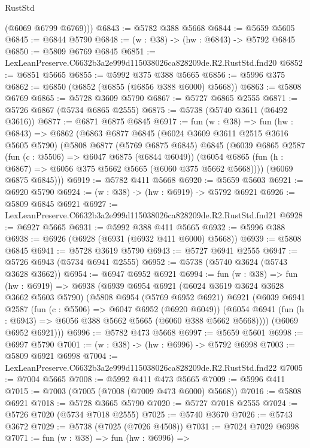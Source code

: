 \begin{lexlean}{RustStd}
\begin{coremodule}
        (@6069 @6799 @6769)))
@6843 := @5782 @388 @5668
@6844 := @5659 @5605
@6845 := @6844 @5790
@6848 := (w : @38) -> (hw : @6843) -> @5792 @6845
@6850 := @5809 @6769 @6845
@6851 := LexLeanPreserve.C6632b3a2e999d115038026ca828209de.R2.RustStd.fnd20
@6852 := @6851 @5665
@6855 := @5992 @375 @388 @5665
@6856 := @5996 @375
@6862 := @6850 (@6852 (@6855 (@6856 @388 @6000) @5668))
@6863 := @5808 @6769
@6865 := @5728 @3609 @5790
@6867 := @5727 @6865 @2555
@6871 := @5726 @6867 (@5734 @6865 @2555)
@6875 := @5738 (@5740 @3611 (@6492 @3616))
@6877 := @6871 @6875 @6845
@6917 := fun (w : @38) =>
  fun (hw : @6843) =>
  @6862
    (@6863
      @6877
      @6845
      (@6024 @3609 @3611 @2515 @3616 @5605 @5790)
      (@5808
        @6877
        (@5769 @6875 @6845)
        @6845
        (@6039
          @6865
          @2587
          (fun (c : @5506) => @6047 @6875 (@6844 @6049))
          (@6054 @6865 (fun (h : @6867) => @6056 @375 @5662 @5665 (@6060 @375 @5662 @5668))))
        (@6069 @6875 @6845)))
@6919 := @5782 @411 @5668
@6920 := @5659 @5603
@6921 := @6920 @5790
@6924 := (w : @38) -> (hw : @6919) -> @5792 @6921
@6926 := @5809 @6845 @6921
@6927 := LexLeanPreserve.C6632b3a2e999d115038026ca828209de.R2.RustStd.fnd21
@6928 := @6927 @5665
@6931 := @5992 @388 @411 @5665
@6932 := @5996 @388
@6938 := @6926 (@6928 (@6931 (@6932 @411 @6000) @5668))
@6939 := @5808 @6845
@6941 := @5728 @3619 @5790
@6943 := @5727 @6941 @2555
@6947 := @5726 @6943 (@5734 @6941 @2555)
@6952 := @5738 (@5740 @3624 (@5743 @3628 @3662))
@6954 := @6947 @6952 @6921
@6994 := fun (w : @38) =>
  fun (hw : @6919) =>
  @6938
    (@6939
      @6954
      @6921
      (@6024 @3619 @3624 @3628 @3662 @5603 @5790)
      (@5808
        @6954
        (@5769 @6952 @6921)
        @6921
        (@6039
          @6941
          @2587
          (fun (c : @5506) => @6047 @6952 (@6920 @6049))
          (@6054 @6941 (fun (h : @6943) => @6056 @388 @5662 @5665 (@6060 @388 @5662 @5668))))
        (@6069 @6952 @6921)))
@6996 := @5782 @473 @5668
@6997 := @5659 @5601
@6998 := @6997 @5790
@7001 := (w : @38) -> (hw : @6996) -> @5792 @6998
@7003 := @5809 @6921 @6998
@7004 := LexLeanPreserve.C6632b3a2e999d115038026ca828209de.R2.RustStd.fnd22
@7005 := @7004 @5665
@7008 := @5992 @411 @473 @5665
@7009 := @5996 @411
@7015 := @7003 (@7005 (@7008 (@7009 @473 @6000) @5668))
@7016 := @5808 @6921
@7018 := @5728 @3665 @5790
@7020 := @5727 @7018 @2555
@7024 := @5726 @7020 (@5734 @7018 @2555)
@7025 := @5740 @3670
@7026 := @5743 @3672
@7029 := @5738 (@7025 (@7026 @4508))
@7031 := @7024 @7029 @6998
@7071 := fun (w : @38) =>
  fun (hw : @6996) =>

\end{coremodule}
\end{lexlean}
